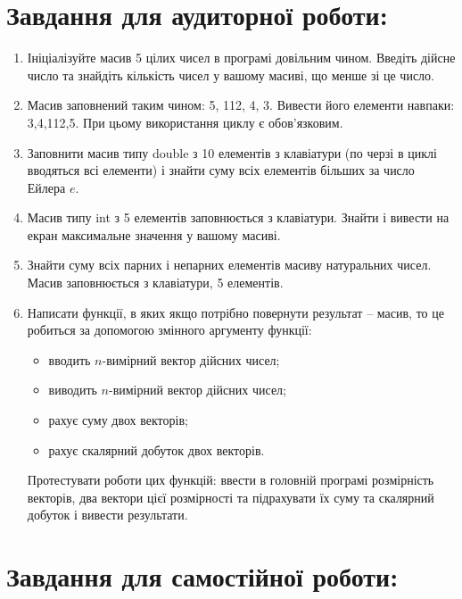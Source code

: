 \documentclass[a5paper,titlepage,openany,twoside,draft]{book_unv}%
\begin{document}
\section{Завдання для аудиторної роботи:}

\begin{enumerate}
\def\labelenumi{\arabic{enumi})}
\item
  Ініціалізуйте масив 5 цілих чисел в програмі довільним чином. Введіть
  дійсне число та знайдіть кількість чисел у вашому масиві, що менше зі
  це число.

\item
  Масив заповнений таким чином: 5, 112, 4, 3. Вивести його елементи
  навпаки: 3,4,112,5. При цьому використання циклу є обов'язковим.
\item
  Заповнити масив типу double з 10 елементів з клавіатури (по черзі в
  циклі вводяться всі елементи) і знайти суму всіх елементів більших за
  число Ейлера \(e\).
\item
  Масив типу int з 5 елементів заповнюється з клавіатури. Знайти і
  вивести на екран максимальне значення у вашому масиві.
\item
  Знайти суму всіх парних і непарних елементів масиву натуральних чисел.
  Масив заповнюється з клавіатури, 5 елементів.
\item
Написати функції, в яких якщо потрібно повернути результат -- масив,
то це робиться за допомогою змінного аргументу функції:
\begin{itemize}
\item вводить $n$-вимірний вектор дійсних чисел;
\item виводить $n$-вимірний вектор дійсних чисел;
\item рахує суму двох векторів;
\item рахує скалярний добуток двох векторів.
 \end{itemize}
Протестувати роботи цих функцій: ввести в головній програмі розмірність
векторів, два вектори цієї розмірності та підрахувати їх суму та скалярний
добуток і вивести результати.
\end{enumerate}

\section{Завдання для самостійної роботи:}
\end{document}
